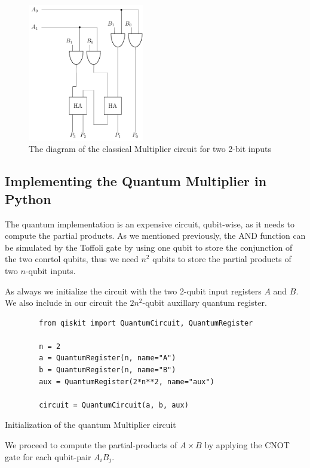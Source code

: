 \begin{figure}[ht]
    \centering
    \includegraphics[height=6cm]{images/5_Implementation/classical_2bit_multiplier.pdf}
    \caption{The diagram of the classical Multiplier circuit for two 2-bit inputs}
\end{figure}

\subsection{Implementing the Quantum Multiplier in Python}

The quantum implementation is an expensive circuit, qubit-wise, as it needs to compute the
partial products. As we mentioned previously, the AND function can be simulated by the Toffoli gate
by using one  qubit to store the conjunction of the two conrtol qubits, thus we
need $n^2$ qubits to store the partial products of two $n$-qubit inputs.

As always we initialize the circuit with the two 2-qubit input registers $A$ and $B$. We also
include in our circuit the $2n^2$-qubit auxillary quantum register.

\begin{listing}[ht]
    \centering
    \begin{verbatim}
        from qiskit import QuantumCircuit, QuantumRegister

        n = 2
        a = QuantumRegister(n, name="A")
        b = QuantumRegister(n, name="B")
        aux = QuantumRegister(2*n**2, name="aux")

        circuit = QuantumCircuit(a, b, aux)
    \end{verbatim}
    \caption{Initialization of the quantum Multiplier circuit}
\end{listing}

We proceed to compute the partial-products of $A \times B$ by applying the CNOT gate for each
qubit-pair $A_iB_j$.


